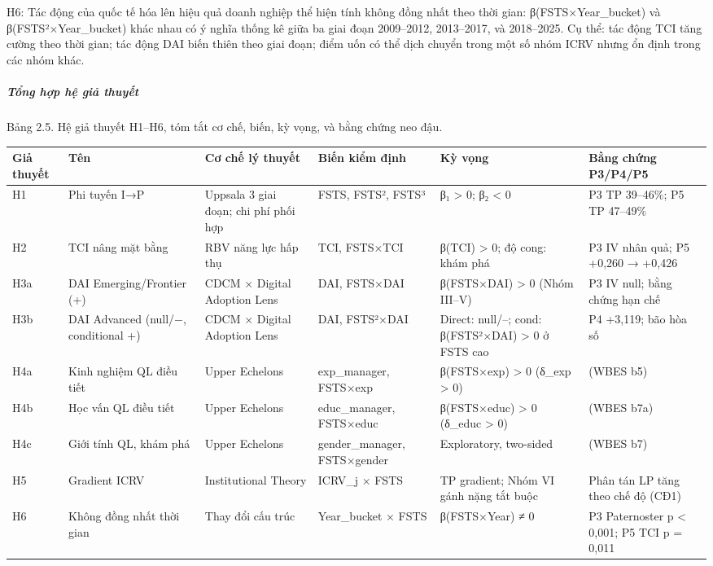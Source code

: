 \documentclass[12pt,a4paper]{article}
\begin{document}
H6: Tác động của quốc tế hóa lên hiệu quả doanh nghiệp thể hiện tính
không đồng nhất theo thời gian: β(FSTS×Year\_bucket) và
β(FSTS²×Year\_bucket) khác nhau có ý nghĩa thống kê giữa ba giai đoạn
2009--2012, 2013--2017, và 2018--2025. Cụ thể: tác động TCI tăng cường
theo thời gian; tác động DAI biến thiên theo giai đoạn; điểm uốn có thể
dịch chuyển trong một số nhóm ICRV nhưng ổn định trong các nhóm khác.

\hypertarget{tux1ed5ng-hux1ee3p-hux1ec7-giux1ea3-thuyux1ebft}{%
\subparagraph{Tổng hợp hệ giả
thuyết}\label{tux1ed5ng-hux1ee3p-hux1ec7-giux1ea3-thuyux1ebft}}

Bảng 2.5. Hệ giả thuyết H1--H6, tóm tắt cơ chế, biến, kỳ vọng, và bằng
chứng neo đậu.

\begin{longtable}[]{@{}llllll@{}}
\toprule\noalign{}
Giả thuyết & Tên & Cơ chế lý thuyết & Biến kiểm định & Kỳ vọng & Bằng
chứng P3/P4/P5 \\
\midrule\noalign{}
\endhead
\bottomrule\noalign{}
\endlastfoot
H1 & Phi tuyến I→P & Uppsala 3 giai đoạn; chi phí phối hợp & FSTS,
FSTS², FSTS³ & β₁ \textgreater{} 0; β₂ \textless{} 0 & P3 TP 39--46\%;
P5 TP 47--49\% \\
H2 & TCI nâng mặt bằng & RBV năng lực hấp thụ & TCI, FSTS×TCI & β(TCI)
\textgreater{} 0; độ cong: khám phá & P3 IV nhân quả; P5 +0,260 →
+0,426 \\
H3a & DAI Emerging/Frontier (+) & CDCM × Digital Adoption Lens & DAI,
FSTS×DAI & β(FSTS×DAI) \textgreater{} 0 (Nhóm III--V) & P3 IV null; bằng
chứng hạn chế \\
H3b & DAI Advanced (null/−, conditional +) & CDCM × Digital Adoption
Lens & DAI, FSTS²×DAI & Direct: null/--; cond: β(FSTS²×DAI)
\textgreater{} 0 ở FSTS cao & P4 +3,119; bão hòa số \\
H4a & Kinh nghiệm QL điều tiết & Upper Echelons & exp\_manager, FSTS×exp
& β(FSTS×exp) \textgreater{} 0 (δ\_exp \textgreater{} 0) & (WBES b5) \\
H4b & Học vấn QL điều tiết & Upper Echelons & educ\_manager, FSTS×educ &
β(FSTS×educ) \textgreater{} 0 (δ\_educ \textgreater{} 0) & (WBES b7a) \\
H4c & Giới tính QL, khám phá & Upper Echelons & gender\_manager,
FSTS×gender & Exploratory, two-sided & (WBES b7) \\
H5 & Gradient ICRV & Institutional Theory & ICRV\_j × FSTS & TP
gradient; Nhóm VI gánh nặng tắt buộc & Phân tán LP tăng theo chế độ
(CĐ1) \\
H6 & Không đồng nhất thời gian & Thay đổi cấu trúc & Year\_bucket × FSTS
& β(FSTS×Year) ≠ 0 & P3 Paternoster p \textless{} 0,001; P5 TCI p =
0,011 \\
\end{longtable}
\end{document}
